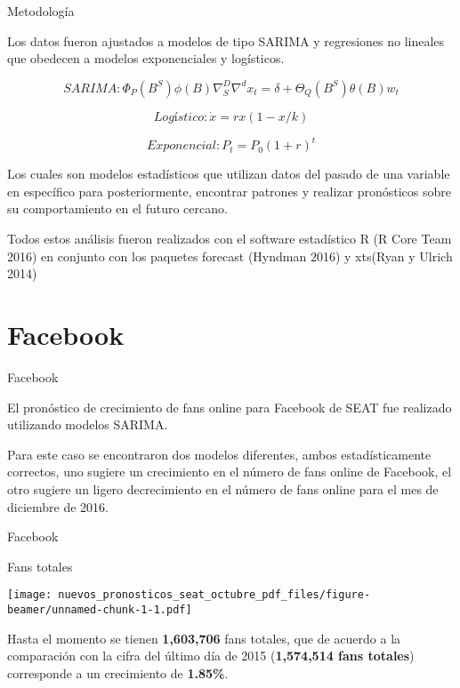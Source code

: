 \documentclass[ignorenonframetext,]{beamer}
\begin{document}
\begin{frame}{Metodología}

Los datos fueron ajustados a modelos de tipo SARIMA y regresiones no
lineales que obedecen a modelos exponenciales y logísticos.

\[
SARIMA: \Phi_{P} (B^{S}) \phi(B) \nabla_{S}^{D} \nabla^{d} x_{t} = 
        \delta + \varTheta_{Q} (B^S) \theta(B) w_t
\]

\[
Logístico: \dot x = rx (1 - x/k)
\]

\[
Exponencial: P_{t} = P_{0}(1+r)^t
\]

Los cuales son modelos estadísticos que utilizan datos del pasado de una
variable en específico para posteriormente, encontrar patrones y
realizar pronósticos sobre su comportamiento en el futuro cercano.

\tiny
Todos estos análisis fueron realizados con el software estadístico R (R
Core Team 2016) en conjunto con los paquetes forecast (Hyndman 2016) y
xts(Ryan y Ulrich 2014)

\end{frame}

\section{Facebook}\label{facebook}

\begin{frame}{Facebook}

El pronóstico de crecimiento de fans online para Facebook de SEAT fue
realizado utilizando modelos SARIMA.

Para este caso se encontraron dos modelos diferentes, ambos
estadísticamente correctos, uno sugiere un crecimiento en el número de
fans online de Facebook, el otro sugiere un ligero decrecimiento en el
número de fans online para el mes de diciembre de 2016.

\end{frame}

\begin{frame}{Facebook}

\begin{block}{Fans totales}

\texttt{[image: nuevos\_pronosticos\_seat\_octubre\_pdf\_files/figure-beamer/unnamed-chunk-1-1.pdf]}

Hasta el momento se tienen \textbf{1,603,706} fans totales, que de
acuerdo a la comparación con la cifra del último día de 2015
(\textbf{1,574,514 fans totales}) corresponde a un crecimiento de
\textbf{1.85\%}.

\end{block}

\end{frame}
\end{document}
